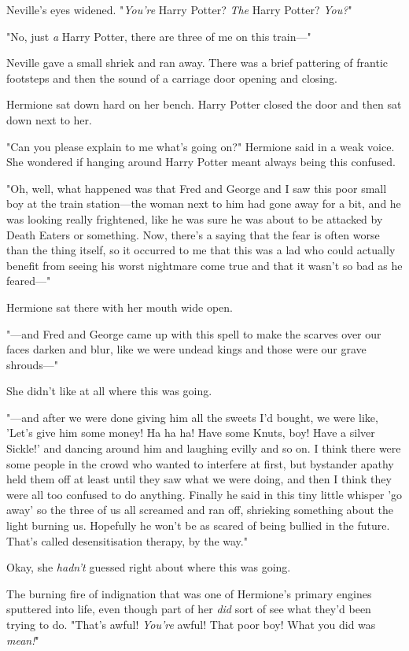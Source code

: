 Neville's eyes widened. "\emph{You're} Harry Potter? \emph{The} Harry Potter? \emph{You?}"

"No, just \emph{a} Harry Potter, there are three of me on this train---"

Neville gave a small shriek and ran away. There was a brief pattering of frantic footsteps and then the sound of a carriage door opening and closing.

Hermione sat down hard on her bench. Harry Potter closed the door and then sat down next to her.

"Can you please explain to me what's going on?" Hermione said in a weak voice. She wondered if hanging around Harry Potter meant always being this confused.

"Oh, well, what happened was that Fred and George and I saw this poor small boy at the train station---the woman next to him had gone away for a bit, and he was looking really frightened, like he was sure he was about to be attacked by Death Eaters or something. Now, there's a saying that the fear is often worse than the thing itself, so it occurred to me that this was a lad who could actually benefit from seeing his worst nightmare come true and that it wasn't so bad as he feared---"

Hermione sat there with her mouth wide open.

"---and Fred and George came up with this spell to make the scarves over our faces darken and blur, like we were undead kings and those were our grave shrouds---"

She didn't like at all where this was going.

"---and after we were done giving him all the sweets I'd bought, we were like, 'Let's give him some money! Ha ha ha! Have some Knuts, boy! Have a silver Sickle!' and dancing around him and laughing evilly and so on. I think there were some people in the crowd who wanted to interfere at first, but bystander apathy held them off at least until they saw what we were doing, and then I think they were all too confused to do anything. Finally he said in this tiny little whisper 'go away' so the three of us all screamed and ran off, shrieking something about the light burning us. Hopefully he won't be as scared of being bullied in the future. That's called desensitisation therapy, by the way."

Okay, she \emph{hadn't} guessed right about where this was going.

The burning fire of indignation that was one of Hermione's primary engines sputtered into life, even though part of her \emph{did} sort of see what they'd been trying to do. "That's awful! \emph{You're} awful! That poor boy! What you did was \emph{mean!}"

